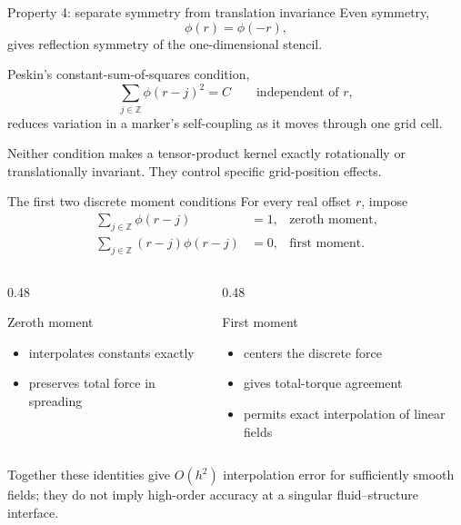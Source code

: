\documentclass[aspectratio=169,11pt]{beamer}
\begin{document}
\begin{frame}{Property 4: separate symmetry from translation invariance}
Even symmetry,
\[
  \phi(r)=\phi(-r),
\]
gives reflection symmetry of the one-dimensional stencil.

\medskip
Peskin's constant-sum-of-squares condition,
\[
  \sum_{j\in\mathbb Z}\phi(r-j)^2=C
  \qquad\text{independent of }r,
\]
reduces variation in a marker's self-coupling as it moves through one grid cell.

\begin{punchbox}
Neither condition makes a tensor-product kernel exactly rotationally or translationally invariant. They control specific grid-position effects.
\end{punchbox}
\end{frame}

\begin{frame}{The first two discrete moment conditions}
\small
For every real offset \(r\), impose
\begin{align*}
  \sum_{j\in\mathbb Z}\phi(r-j)&=1,
  &\text{zeroth moment},\\
  \sum_{j\in\mathbb Z}(r-j)\phi(r-j)&=0,
  &\text{first moment}.
\end{align*}

\begin{columns}[T,onlytextwidth]
  \begin{column}{0.48\textwidth}
  \begin{block}{Zeroth moment}
    \begin{itemize}
      \item interpolates constants exactly
      \item preserves total force in spreading
    \end{itemize}
  \end{block}
  \end{column}
  \begin{column}{0.48\textwidth}
  \begin{block}{First moment}
    \begin{itemize}
      \item centers the discrete force
      \item gives total-torque agreement
      \item permits exact interpolation of linear fields
    \end{itemize}
  \end{block}
  \end{column}
\end{columns}

\begin{punchbox}
Together these identities give \(O(h^2)\) interpolation error for sufficiently smooth fields; they do not imply high-order accuracy at a singular fluid--structure interface.
\end{punchbox}
\end{frame}
\end{document}
